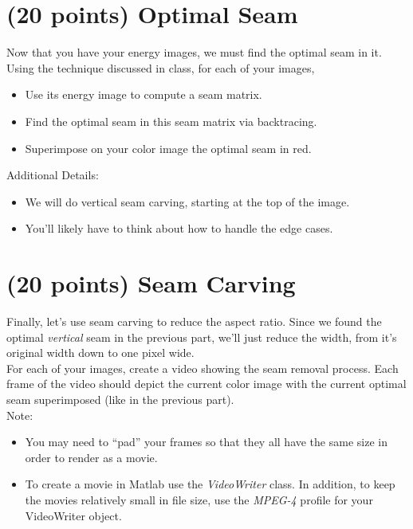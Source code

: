 \documentclass{article}
\begin{document}
\newpage

\section{(20 points) Optimal Seam}
Now that you have your energy images, we must find the optimal seam in it.\\

\noindent
Using the technique discussed in class, for each of your images, 

\begin{itemize}
\item Use its energy image to compute a seam matrix.
\item Find the optimal seam in this seam matrix via backtracing.
\item Superimpose on your color image the optimal seam in red.
\end{itemize}

\noindent
Additional Details:
\begin{itemize}
\item We will do vertical seam carving, starting at the top of the image.
\item You’ll likely have to think about how to handle the edge cases.
\end{itemize}

\noindent

\newpage

\section{(20 points) Seam Carving}
Finally, let's use seam carving to reduce the aspect ratio. Since we found the optimal \emph{vertical} seam in the previous part, we'll just reduce the width, from it's original width down to one pixel wide. \\

\noindent
For each of your images, create a video showing the seam removal process.  Each frame of the video should depict the current color image with the current optimal seam superimposed (like in the previous part). \\

\noindent
Note:
\begin{itemize}
\item You may need to “pad” your frames so that they all have the same size in order to render as a movie.
\item To create a movie in Matlab use the \emph{VideoWriter} class.  In addition, to keep the movies relatively small in file size, use the \emph{MPEG-4} profile for your VideoWriter object.
\end{itemize}

\newpage
\end{document}
